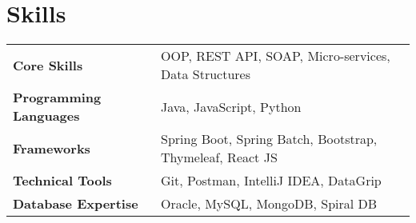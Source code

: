 \section{\textbf{Skills}}
\begin{tabularx}{\linewidth}{@{}l X@{}}
    \textbf{Core Skills} & \normalsize{OOP, REST API, SOAP, Micro-services, Data Structures}
    \\ \textbf{Programming Languages} & \normalsize{Java, JavaScript, Python} \\
    \textbf{Frameworks} & \normalsize{Spring Boot, Spring Batch, Bootstrap, Thymeleaf, React JS}
    \\ \textbf{Technical Tools} & \normalsize{Git, Postman, IntelliJ IDEA, DataGrip}
    \\ \textbf{Database Expertise} & \normalsize{Oracle, MySQL, MongoDB, Spiral DB}
    \\
\end{tabularx}
